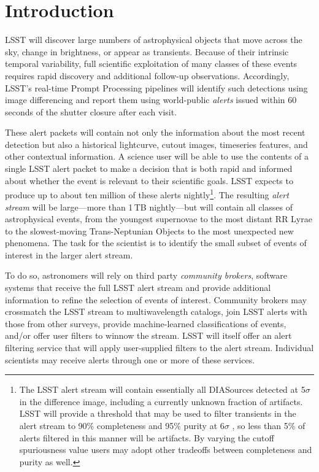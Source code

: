 \section{Introduction}\label{sec:introduction}

LSST will discover large numbers of astrophysical objects that move across the sky, change in brightness, or appear as transients.
Because of their intrinsic temporal variability, full scientific exploitation of many classes of these events requires rapid discovery and additional follow-up observations.
Accordingly, LSST's real-time Prompt Processing pipelines will identify such detections using image differencing and report them using world-public \textit{alerts} issued within 60 seconds of the shutter closure after each visit.

These alert packets will contain not only the information about the most recent detection but also a historical lightcurve, cutout images, timeseries features, and other contextual information.
A science user will be able to use the contents of a single LSST alert packet to make a decision that is both rapid and informed about whether the event is relevant to their scientific goals.
LSST expects to produce up to about ten million of these alerts nightly\footnote{The LSST alert stream will contain essentially all DIASources detected at 5$\sigma$ in the difference image, including a currently unknown fraction of artifacts.
LSST will provide a threshold that may be used to filter transients in the alert stream to 90\% completeness and 95\% purity at 6$\sigma$ , so less than 5\% of alerts filtered in this manner will be artifacts.
By varying the cutoff spuriousness value users may adopt other tradeoffs between completeness and purity as well.}.
The resulting \textit{alert stream} will be large---more than 1\,TB nightly---but will contain all classes of astrophysical events, from the youngest supernovae to the most distant RR Lyrae to the slowest-moving Trans-Neptunian Objects to the most unexpected new phenomena.
The task for the scientist is to identify the small subset of events of interest in the larger alert stream.

To do so, astronomers will rely on third party \textit{community brokers}, software systems that receive the full LSST alert stream and provide additional information to refine the selection of events of interest.
Community brokers may crossmatch the LSST stream to multiwavelength catalogs, join LSST alerts with those from other surveys, provide machine-learned classifications of events, and/or offer user filters to winnow the stream.
LSST will itself offer an alert filtering service  that will apply user-supplied filters to the alert stream.
Individual scientists may receive alerts through one or more of these services.

